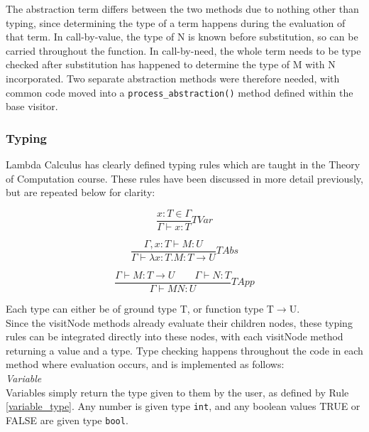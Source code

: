 \documentclass[a4paper,12pt]{report}
\begin{document}
The abstraction term differs between the two methods due to nothing other than typing, since determining the type of a term happens during the evaluation of that term. In call-by-value, the type of N is known before substitution, so can be carried throughout the function. In call-by-need, the whole term needs to be type checked after substitution has happened to determine the type of M with N incorporated. Two separate abstraction methods were therefore needed, with common code moved into a \texttt{process_abstraction()} method defined within the base visitor.

\subsubsection{Typing}

Lambda Calculus has clearly defined typing rules which are taught in the Theory of Computation course. These rules have been discussed in more detail previously, but are repeated below for clarity:

\begin{equation*}
\frac{x:T\in \Gamma}{\Gamma \vdash x:T}TVar
\end{equation*}

\begin{equation*}
\frac{\Gamma ,x:T\vdash M:U}{\Gamma \vdash \lambda x:T.M:T \to U}TAbs
\end{equation*}

\begin{equation*}
\frac{\Gamma \vdash M:T \to U \qquad \Gamma \vdash N:T}{\Gamma \vdash MN:U}TApp
\end{equation*}

Each type can either be of ground type T, or function type T$\rightarrow$U\cite{Hankin2004}.\\

Since the visitNode methods already evaluate their children nodes, these typing rules can be integrated directly into these nodes, with each visitNode method returning a value and a type. Type checking happens throughout the code in each method where evaluation occurs, and is implemented as follows:\\

\textit{Variable}\\
Variables simply return the type given to them by the user, as defined by Rule \ref{variable_type}. Any number is given type \texttt{int}, and any boolean values TRUE or FALSE are given type \texttt{bool}.\\
\end{document}
